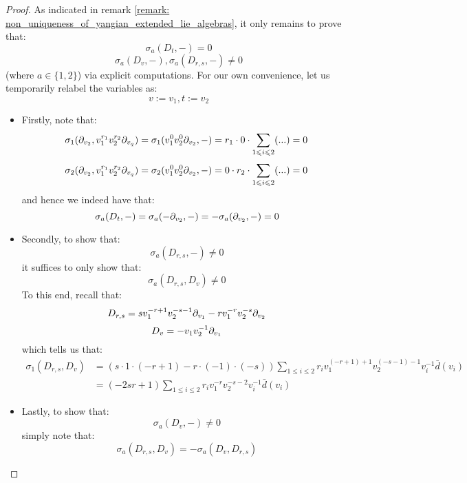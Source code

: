             \begin{proof}
                As indicated in remark \ref{remark: non_uniqueness_of_yangian_extended_lie_algebras}, it only remains to prove that:
                    $$\sigma_a(D_t, -) = 0$$
                    $$\sigma_a(D_v, -), \sigma_a(D_{r, s}, -) \not = 0$$
                (where $a \in \{1, 2\}$) via explicit computations. For our own convenience, let us temporarily relabel the variables as:
                    $$v := v_1, t := v_2$$
                \begin{itemize}
                    \item Firstly, note that:
                        $$\sigma_1(\partial_{v_2}, v_1^{r_1} v_2^{r_2} \partial_{v_q}) = \sigma_1(v_1^0 v_2^0 \partial_{v_2}, -) = r_1 \cdot 0 \cdot \sum_{1 \leqslant i \leqslant 2} (...) = 0$$
                        $$\sigma_2(\partial_{v_2}, v_1^{r_1} v_2^{r_2} \partial_{v_q}) = \sigma_2(v_1^0 v_2^0 \partial_{v_2}, -) = 0 \cdot r_2 \cdot \sum_{1 \leqslant i \leqslant 2} (...) = 0$$
                    and hence we indeed have that:
                        $$\sigma_a(D_t, -) = \sigma_a(-\partial_{v_2}, -) = -\sigma_a(\partial_{v_2}, -) = 0$$
                    \item Secondly, to show that:
                        $$\sigma_a(D_{r, s}, -) \not = 0$$
                    it suffices to only show that:
                        $$\sigma_a(D_{r, s}, D_v) \not = 0$$
                    To this end, recall that:
                        $$D_{r, s} = s v_1^{-r + 1} v_2^{-s - 1} \partial_{v_1} - r v_1^{-r} v_2^{-s} \partial_{v_2}$$
                        $$D_v = -v_1 v_2^{-1} \partial_{v_1}$$
                    which tells us that:
                        $$
                            \begin{aligned}
                                \sigma_1(D_{r, s}, D_v) & = ( s \cdot 1 \cdot (-r + 1) - r \cdot (-1) \cdot (-s) ) \sum_{1 \leq i \leq 2} r_i v_1^{(-r + 1) + 1} v_2^{(-s - 1) - 1} v_i^{-1} \bar{d}(v_i)
                                \\
                                & = (-2sr + 1) \sum_{1 \leq i \leq 2} r_i v_1^{-r} v_2^{-s - 2} v_i^{-1} \bar{d}(v_i)
                            \end{aligned}
                        $$
                    \item Lastly, to show that:
                        $$\sigma_a(D_v, -) \not = 0$$
                    simply note that:
                        $$\sigma_a(D_{r, s}, D_v) = -\sigma_a(D_v, D_{r, s})$$
                \end{itemize}
            \end{proof}
